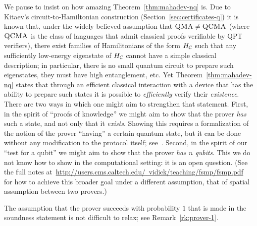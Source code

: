 \begin{remark}
We pause to insist on how amazing Theorem~\ref{thm:mahadev-nq} is. Due to Kitaev's circuit-to-Hamiltonian construction (Section~\ref{sec:certificates-q}) it is known that, under the widely believed assumption that $\textsc{QMA} \neq \textsc{QCMA}$ (where $\textsc{QCMA}$ is the class of languages that admit classical proofs verifiable by QPT verifiers), there exist families of Hamilitonians of the form $H_{\mathcal{C}}$ such that any sufficiently low-energy eigenstate of $H_{\mathcal{C}}$ cannot have a simple classical description; in particular, there is no small quantum circuit to prepare such eigenstates, they must have high entanglement, etc. Yet Theorem~\ref{thm:mahadev-nq} states that through an efficient classical interaction with a device that has the ability to prepare such states it is possible to \emph{efficiently} verify their \emph{existence}. There are two ways in which one might aim to strengthen that statement. First, in the spirit of ``proofs of knowledge'' we might aim to show that the prover \emph{has} such a state, and not only that it \emph{exists}. Showing this requires a formalization of the notion of the prover ``having'' a certain quantum state, but it can be done without any modification to the protocol itself; see~\cite{vidick2020classical}. Second, in the spirit of our ``test for a qubit'' we might aim to show that the prover \emph{has $n$ qubits}. This we do not know how to show in the computational setting: it is an open question. (See the full notes at~\href{http://users.cms.caltech.edu/\~{}vidick/teaching/fsmp/fsmp.pdf}{http://users.cms.caltech.edu/~vidick/teaching/fsmp/fsmp.pdf} for how to achieve this broader goal under a different assumption, that of spatial assumption between two provers.)
\end{remark}

\begin{remark}
The assumption that the prover succeeds with probability $1$ that is made in the soundness statement is not difficult to relax; see Remark~\ref{rk:prover-1}. 
\end{remark}



